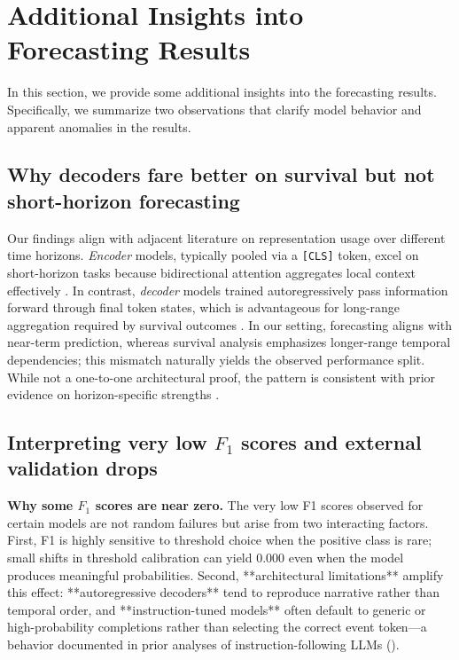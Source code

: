 \clearpage
\twocolumn
\section{Additional Insights into Forecasting Results}
\label{apd:additional_insights}

In this section, we provide some additional insights into the forecasting results. Specifically, we summarize two observations that clarify model behavior and apparent anomalies in the results.

\subsection{Why decoders fare better on survival but not short-horizon forecasting}
 Our findings align with adjacent literature on representation usage over different time horizons. \emph{Encoder} models, typically pooled via a \texttt{[CLS]} token, excel on short-horizon tasks because bidirectional attention aggregates local context effectively \citep{devlin2019bert,bai2018empirical}. In contrast, \emph{decoder} models trained autoregressively pass information forward through final token states, which is advantageous for long-range aggregation required by survival outcomes \citep{dai2019style,zhou2021informer}. In our setting, forecasting aligns with near-term prediction, whereas survival analysis emphasizes longer-range temporal dependencies; this mismatch naturally yields the observed performance split. While not a one-to-one architectural proof, the pattern is consistent with prior evidence on horizon-specific strengths \citep{wang2025large}.

\subsection{Interpreting very low $F_{1}$ scores and external validation drops}
 \textbf{Why some $F_{1}$ scores are near zero.} The very low F1 scores observed for certain models are not random failures but arise from two interacting factors. First, F1 is highly sensitive to threshold choice when the positive class is rare; small shifts in threshold calibration can yield 0.000 even when the model produces meaningful probabilities. Second, **architectural limitations** amplify this effect: **autoregressive decoders** tend to reproduce narrative rather than temporal order, and **instruction-tuned models** often default to generic or high-probability completions rather than selecting the correct event token—a behavior documented in prior analyses of instruction-following LLMs (\cite{liu2024lost, wei2021finetuned}).

